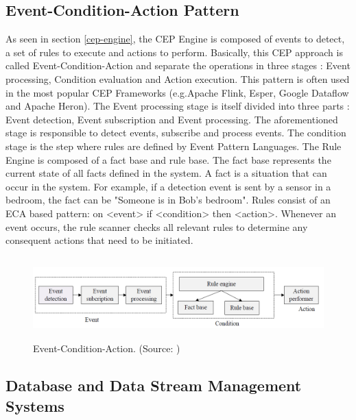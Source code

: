 \documentclass[11pt]{article}
\begin{document}

\subsection{Event-Condition-Action Pattern}

As seen in section \ref{cep-engine}, the CEP Engine is composed of events to detect, a set of rules to execute and actions to perform. Basically, this CEP approach is called Event-Condition-Action and separate the operations in three stages : Event processing, Condition evaluation and Action execution. This pattern is often used in the most popular CEP Frameworks (e.g.Apache Flink, Esper, Google Dataflow and Apache Heron). The Event processing stage is itself divided into three parts : Event detection, Event subscription and Event processing. The aforementioned stage is responsible to detect events, subscribe and process events. The condition stage is the step where rules are defined by Event Pattern Languages. The Rule Engine is composed of a fact base and rule base. The fact base represents the current state of all facts defined in the system. A fact is a situation that can occur in the system. For example, if a detection event is sent by a sensor in a bedroom, the fact can be "Someone is in Bob's bedroom". Rules consist of an ECA based pattern: on {<}event{>} if {<}condition{>} then {<}action{>}. Whenever an event occurs, the rule scanner checks all relevant rules to determine any consequent actions that need to be initiated. \cite{An-internet-of-things-system-architecture}

\begin{figure}[h]
	\includegraphics[width=\textwidth,height=90pt]{assets/ECA_illustration.png}
	\caption[Event-Condition-Action]{
	Event-Condition-Action. (Source: \cite{An-internet-of-things-system-architecture})
	}
	\label{fig:Event-Condition-Action}
\end{figure}

\subsection{Database and Data Stream Management Systems}
\end{document}
